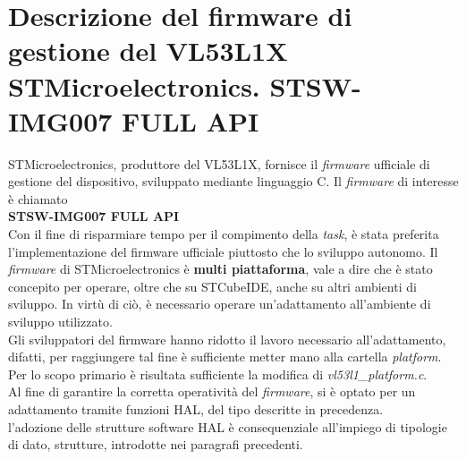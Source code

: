 \documentclass[11pt]{report}
\begin{document}
\section{Descrizione del firmware di gestione del VL53L1X STMicroelectronics. STSW-IMG007 FULL API}
STMicroelectronics, produttore del VL53L1X, fornisce il \textit{firmware} ufficiale di gestione del dispositivo, sviluppato mediante linguaggio C. Il \textit{firmware} di interesse è chiamato\\\textbf{STSW-IMG007 FULL API}\\
Con il fine di risparmiare tempo per il compimento della \textit{task}, è stata preferita l'implementazione del firmware ufficiale piuttosto che lo sviluppo autonomo.
Il \textit{firmware} di STMicroelectronics è \textbf{multi piattaforma}, vale a dire che è stato concepito per operare, oltre che su STCubeIDE, anche su altri ambienti di sviluppo.
In virtù di ciò, è necessario operare un'adattamento all'ambiente di sviluppo utilizzato.\\
Gli sviluppatori del firmware hanno ridotto il lavoro necessario all'adattamento, difatti, per raggiungere tal fine è sufficiente metter mano alla cartella \textit{platform}. Per lo scopo primario è risultata sufficiente la modifica di \textit{vl53l1\_platform.c}.\\
Al fine di garantire la corretta operatività del \textit{firmware}, si è optato per un adattamento tramite funzioni HAL, del tipo descritte in precedenza.\\
l'adozione delle strutture software HAL è consequenziale all'impiego di tipologie di dato, strutture, introdotte nei paragrafi precedenti.
 
\end{document}
